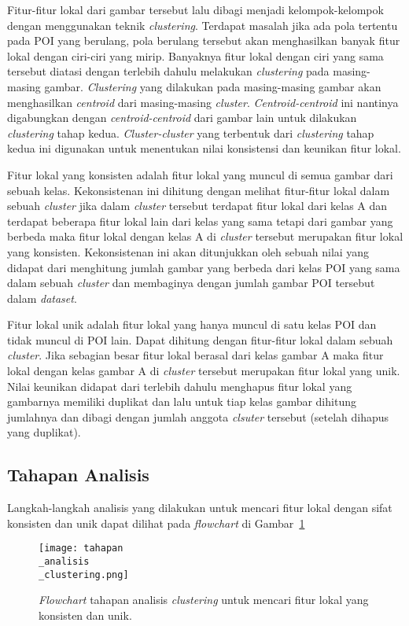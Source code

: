 Fitur-fitur lokal dari gambar tersebut lalu dibagi menjadi kelompok-kelompok dengan menggunakan teknik \textit{clustering}. Terdapat masalah jika ada pola tertentu pada POI yang berulang, pola berulang tersebut akan menghasilkan banyak fitur lokal dengan ciri-ciri yang mirip. Banyaknya fitur lokal dengan ciri yang sama tersebut diatasi dengan terlebih dahulu melakukan \textit{clustering} pada masing-masing gambar. \textit{Clustering} yang dilakukan pada masing-masing gambar akan menghasilkan \textit{centroid} dari masing-masing \textit{cluster}. \textit{Centroid-centroid} ini nantinya digabungkan dengan \textit{centroid-centroid} dari gambar lain untuk dilakukan \textit{clustering} tahap kedua. \textit{Cluster-cluster} yang terbentuk dari \textit{clustering} tahap kedua ini digunakan untuk menentukan nilai konsistensi dan keunikan fitur lokal. 

Fitur lokal yang konsisten adalah fitur lokal yang muncul di semua gambar dari sebuah kelas. Kekonsistenan ini dihitung dengan melihat fitur-fitur lokal dalam sebuah \textit{cluster} jika dalam \textit{cluster} tersebut terdapat fitur lokal dari kelas A dan terdapat beberapa fitur lokal lain dari kelas yang sama tetapi dari gambar yang berbeda maka fitur lokal dengan kelas A di \textit{cluster} tersebut merupakan fitur lokal yang konsisten. Kekonsistenan ini akan ditunjukkan oleh sebuah nilai yang didapat dari menghitung jumlah gambar yang berbeda dari kelas POI yang sama dalam sebuah \textit{cluster} dan membaginya dengan jumlah gambar POI tersebut dalam \textit{dataset}.

Fitur lokal unik adalah fitur lokal yang hanya muncul di satu kelas POI dan tidak muncul di POI lain. Dapat dihitung dengan fitur-fitur lokal dalam sebuah \textit{cluster}. Jika sebagian besar fitur lokal berasal dari kelas gambar A maka fitur lokal dengan kelas gambar A di \textit{cluster} tersebut merupakan fitur lokal yang unik.  Nilai keunikan didapat dari terlebih dahulu menghapus fitur lokal yang gambarnya memiliki duplikat dan lalu untuk tiap kelas gambar dihitung jumlahnya dan dibagi dengan jumlah anggota \textit{clsuter} tersebut (setelah dihapus yang duplikat).

\subsection{Tahapan Analisis}
\label{subsec:tahapan_analisis_clustering}
Langkah-langkah analisis yang dilakukan untuk mencari fitur lokal dengan sifat konsisten dan unik dapat dilihat pada \textit{flowchart} di Gambar~\ref{fig:tahapan_analisis_clustering}
\begin{figure}[H]
	\centering
	\texttt{[image: tahapan\\\_analisis\\\_clustering.png]}
	\caption{\textit{Flowchart} tahapan analisis \textit{clustering} untuk mencari fitur lokal yang konsisten dan unik.}
	\label{fig:tahapan_analisis_clustering}
\end{figure}

